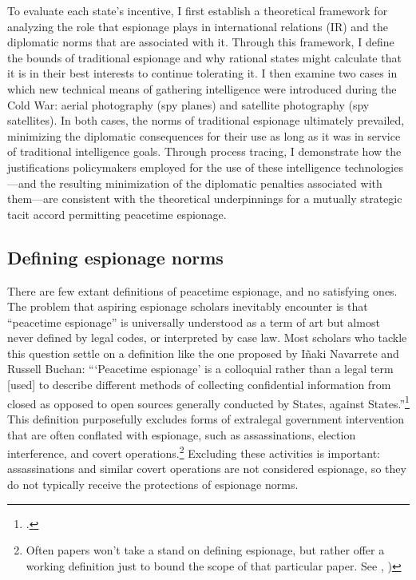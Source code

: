 \documentclass[14pt]{extarticle}
\begin{document}
To evaluate each state's incentive, I first establish a theoretical framework for analyzing the role that espionage plays in international relations (IR) and the diplomatic norms that are associated with it. Through this framework, I define the bounds of traditional espionage and why rational states might calculate that it is in their best interests to continue tolerating it. I then examine two cases in which new technical means of gathering intelligence were introduced during the Cold War: aerial photography (spy planes) and satellite photography (spy satellites). In both cases, the norms of traditional espionage ultimately prevailed, minimizing the diplomatic consequences for their use as long as it was in service of traditional intelligence goals. Through process tracing, I demonstrate how the justifications policymakers employed for the use of these intelligence technologies---and the resulting minimization of the diplomatic penalties associated with them---are consistent with the theoretical underpinnings for a mutually strategic tacit accord permitting peacetime espionage.


\subsection{Defining espionage norms}
There are few extant definitions of peacetime espionage, and no satisfying ones. The problem that aspiring espionage scholars inevitably encounter is that \enquote{peacetime espionage} is universally understood as a term of art but almost never defined by legal codes, or interpreted by case law. Most scholars who tackle this question settle on a definition like the one proposed by I\~{n}aki Navarrete and Russell Buchan: \enquote{\enquote{Peacetime espionage} is a colloquial rather than a legal term [used] to describe different methods of collecting confidential information from closed as opposed to open sources \textelp{} generally conducted by States, against States.}\footcite[p.~901-902]{navarrete_out_2019} This definition purposefully excludes forms of extralegal government intervention that are often conflated with espionage, such as assassinations, election interference, and covert operations.\footnote{Often papers won't take a stand on defining espionage, but rather offer a working definition just to bound the scope of that particular paper. See \cite[p.~600]{radsan_unresolved_2007}, \cite[p.~2]{kapp_spying_2007})} Excluding these activities is important: assassinations and similar covert operations are not considered espionage, so they do not typically receive the protections of espionage norms.
\end{document}

